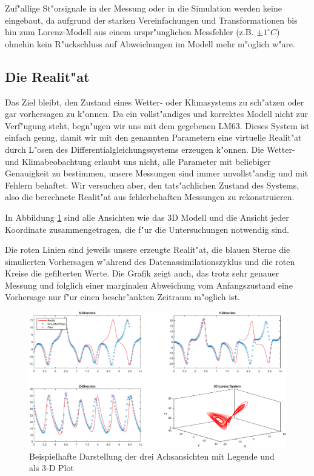\begin{refsection}
Zuf"allige St"orsignale in der Messung oder in die Simulation werden keine eingebaut, da aufgrund der starken Vereinfachungen und Transformationen bis hin zum Lorenz-Modell aus einem urspr"unglichen Messfehler (z.B. $\pm1^\circ C$) ohnehin kein R"uckschluss auf Abweichungen im Modell mehr m"oglich w"are.


\subsection{Die Realit"at}
Das Ziel bleibt, den Zustand eines Wetter- oder Klimasystems zu sch"atzen oder gar vorhersagen zu k"onnen. Da ein vollst"andiges und korrektes Modell nicht zur Verf"ugung steht, begn"ugen wir uns mit dem gegebenen LM63. Dieses System ist einfach genug, damit wir mit den genannten Parametern eine virtuelle Realit"at durch L"osen des Differentialgleichungssystems erzeugen k"onnen. Die Wetter- und Klimabeobachtung erlaubt uns nicht, alle Parameter mit beliebiger Genauigkeit zu bestimmen, unsere Messungen sind immer unvollst"andig und mit Fehlern behaftet. Wir versuchen aber, den tats"achlichen Zustand des Systems, also die berechnete Realit"at aus fehlerbehaften Messungen zu rekonstruieren.

In Abbildung \ref{kalman:Oberfl} sind alle Ansichten wie das 3D Modell und die Ansicht jeder Koordinate zusammengetragen, die f"ur die Untersuchungen notwendig sind.

Die roten Linien sind jeweils unsere erzeugte Realit"at, die blauen Sterne die simulierten Vorhersagen w"ahrend des Datenassimilationszyklus und die roten Kreise die gefilterten Werte. Die Grafik zeigt auch, das trotz sehr genauer Messung und folglich einer marginalen Abweichung vom Anfangszustand eine Vorhersage nur f"ur einen beschr"ankten Zeitraum m"oglich ist. 

\begin{figure}
\centering
\includegraphics[width=\hsize]{kalman/figures/3dsystemview.pdf}
\caption{Beispielhafte Darstellung der drei Achsansichten mit Legende und als 3-D Plot}
\label{kalman:Oberfl}
\end{figure}


\end{refsection}
